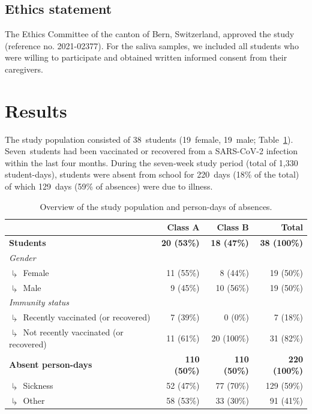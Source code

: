 \documentclass[fleqn,11pt]{wlscirep}
\begin{document}
\subsection{Ethics statement}

\noindent The Ethics Committee of the canton of Bern, Switzerland, approved the study (reference no. 2021-02377). For the saliva samples, we included all students who were willing to participate and obtained written informed consent from their caregivers.


\newpage

\section{Results}

The study population consisted of 38~students (19~female, 19~male; Table~\ref{tab:cases-overview-school}). Seven~students had been vaccinated or recovered from a SARS-CoV-2 infection within the last four months. During the seven-week study period (total of 1,330 student-days), students were absent from school for 220~days (18\% of the total) of which 129~days (59\% of absences) were due to illness.  

\begin{table}[!htpb]
    \centering
    \caption{Overview of the study population and person-days of absences.}
    \label{tab:cases-overview-school}
    \footnotesize
    \begin{tabular}{l r r r}
    \toprule
         &  Class A & Class B & Total \\ \midrule 
        \textbf{Students} & \textbf{20 (53\%)} & \textbf{18 (47\%)} & \textbf{38 (100\%)} \\
        \emph{Gender} \\
        $\drsh$ Female & 11 (55\%) & 8 (44\%) & 19 (\hphantom{0}50\%) \\
        $\drsh$ Male & 9 (45\%) & 10 (56\%) & 19 (\hphantom{0}50\%) \\
        \emph{Immunity status} \\
        $\drsh$ Recently vaccinated (or recovered) & 7 (39\%) & 0 (0\%) & 7 (\hphantom{0}18\%) \\
        $\drsh$ Not recently vaccinated (or recovered) & 11 (61\%) & 20 (100\%) & 31 (\hphantom{0}82\%) \\
        \textbf{Absent person-days} & \textbf{110 (50\%)} & \textbf{110 (50\%)} & \textbf{220 (100\%)} \\
        $\drsh$ Sickness & 52 (47\%) & 77 (70\%) & 129 (\hphantom{0}59\%) \\
        $\drsh$ Other & 58 (53\%) & 33 (30\%) & 91 (\hphantom{0}41\%) \\
        \bottomrule
    \end{tabular} 
\end{table}
\end{document}
